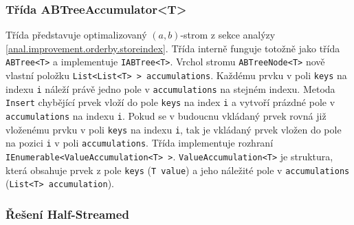 \subsubsection{Třída ABTreeAccumulator<T>}

Třída představuje optimalizovaný $(a, b)$-strom z sekce analýzy \ref{anal.improvement.orderby.storeindex}.
Třída interně funguje totožně jako třída \texttt{ABTree<T>} a implementuje \texttt{IABTree<T>}.
Vrchol stromu \texttt{ABTreeNode<T>} nově vlastní položku \texttt{List<List<T> > accumulations}.
Každému prvku v poli \texttt{keys} na indexu \texttt{i} náleží právě jedno pole v \texttt{accumulations} na stejném indexu.
Metoda \texttt{Insert} chybějící prvek vloží do pole \texttt{keys} na index \texttt{i} a vytvoří prázdné pole v \texttt{accumulations} na indexu \texttt{i}.
Pokud se v budoucnu vkládaný prvek rovná již vloženému prvku v poli \texttt{keys} na indexu \texttt{i}, tak je vkládaný prvek vložen do pole na pozici \texttt{i} v poli \texttt{accumulations}.
Třída implementuje rozhraní \texttt{IEnumerable<ValueAccumulation<T> >}.
\texttt{ValueAccumulation<T>} je struktura, která obsahuje prvek z pole \texttt{keys} (\texttt{T value}) a jeho náležité pole v \texttt{accumulations} (\texttt{List<T> accumulation}).

\subsubsection{Řešení Half-Streamed}

